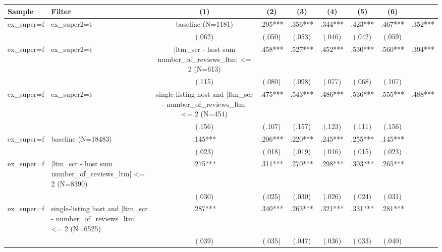 \begin{tabular}{llcccccc}
\hline
Sample & Filter & (1) & (2) & (3) & (4) & (5) & (6) \\
\hline
ex_super=f & ex_super2=t & baseline (N=1181) & .295*** & .356*** & .344*** & .423*** & .467*** & .352***
\\
 &  & (.062) & (.050) & (.053) & (.046) & (.042) & (.059)
\\
ex_super=f & ex_super2=t & |ltm_scr - host sum number_of_reviews_ltm| <= 2 (N=613) & .458*** & .527*** & .452*** & .530*** & .560*** & .394***
\\
 &  & (.115) & (.080) & (.098) & (.077) & (.068) & (.107)
\\
ex_super=f & ex_super2=t & single-listing host and |ltm_scr - number_of_reviews_ltm| <= 2 (N=454) & .475*** & .543*** & .486*** & .536*** & .555*** & .488***
\\
 &  & (.156) & (.107) & (.157) & (.123) & (.111) & (.156)
\\
ex_super=f & baseline (N=18483) & .145*** & .206*** & .220*** & .245*** & .255*** & .145***
\\
 &  & (.023) & (.018) & (.019) & (.016) & (.015) & (.023)
\\
ex_super=f & |ltm_scr - host sum number_of_reviews_ltm| <= 2 (N=8390) & .275*** & .311*** & .270*** & .298*** & .303*** & .265***
\\
 &  & (.030) & (.025) & (.030) & (.026) & (.024) & (.031)
\\
ex_super=f & single-listing host and |ltm_scr - number_of_reviews_ltm| <= 2 (N=6525) & .287*** & .340*** & .263*** & .321*** & .331*** & .281***
\\
 &  & (.039) & (.035) & (.047) & (.036) & (.033) & (.040)
\\
\hline
\end{tabular}
